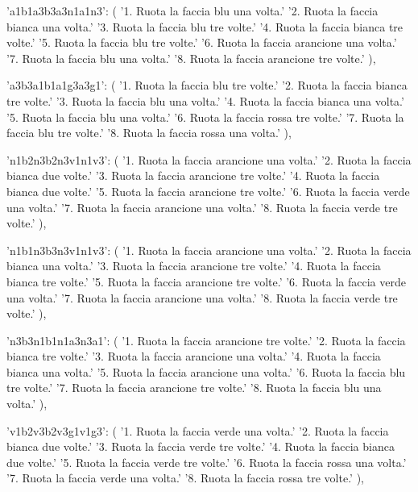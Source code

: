 {{        'a1b1a3b3a3n1a1n3': (
            '1. Ruota la faccia blu una volta.\n'
            '2. Ruota la faccia bianca una volta.\n'
            '3. Ruota la faccia blu tre volte.\n'
            '4. Ruota la faccia bianca tre volte.\n'
            '5. Ruota la faccia blu tre volte.\n'
            '6. Ruota la faccia arancione una volta.\n'
            '7. Ruota la faccia blu una volta.\n'
            '8. Ruota la faccia arancione tre volte.'
        ),

        'a3b3a1b1a1g3a3g1': (
            '1. Ruota la faccia blu tre volte.\n'
            '2. Ruota la faccia bianca tre volte.\n'
            '3. Ruota la faccia blu una volta.\n'
            '4. Ruota la faccia bianca una volta.\n'
            '5. Ruota la faccia blu una volta.\n'
            '6. Ruota la faccia rossa tre volte.\n'
            '7. Ruota la faccia blu tre volte.\n'
            '8. Ruota la faccia rossa una volta.'
        ),

        'n1b2n3b2n3v1n1v3': (
            '1. Ruota la faccia arancione una volta.\n'
            '2. Ruota la faccia bianca due volte.\n'
            '3. Ruota la faccia arancione tre volte.\n'
            '4. Ruota la faccia bianca due volte.\n'
            '5. Ruota la faccia arancione tre volte.\n'
            '6. Ruota la faccia verde una volta.\n'
            '7. Ruota la faccia arancione una volta.\n'
            '8. Ruota la faccia verde tre volte.'
        ),

        'n1b1n3b3n3v1n1v3': (
            '1. Ruota la faccia arancione una volta.\n'
            '2. Ruota la faccia bianca una volta.\n'
            '3. Ruota la faccia arancione tre volte.\n'
            '4. Ruota la faccia bianca tre volte.\n'
            '5. Ruota la faccia arancione tre volte.\n'
            '6. Ruota la faccia verde una volta.\n'
            '7. Ruota la faccia arancione una volta.\n'
            '8. Ruota la faccia verde tre volte.'
        ),

        'n3b3n1b1n1a3n3a1': (
            '1. Ruota la faccia arancione tre volte.\n'
            '2. Ruota la faccia bianca tre volte.\n'
            '3. Ruota la faccia arancione una volta.\n'
            '4. Ruota la faccia bianca una volta.\n'
            '5. Ruota la faccia arancione una volta.\n'
            '6. Ruota la faccia blu tre volte.\n'
            '7. Ruota la faccia arancione tre volte.\n'
            '8. Ruota la faccia blu una volta.'
        ),

        'v1b2v3b2v3g1v1g3': (
            '1. Ruota la faccia verde una volta.\n'
            '2. Ruota la faccia bianca due volte.\n'
            '3. Ruota la faccia verde tre volte.\n'
            '4. Ruota la faccia bianca due volte.\n'
            '5. Ruota la faccia verde tre volte.\n'
            '6. Ruota la faccia rossa una volta.\n'
            '7. Ruota la faccia verde una volta.\n'
            '8. Ruota la faccia rossa tre volte.'
        ),

}}
